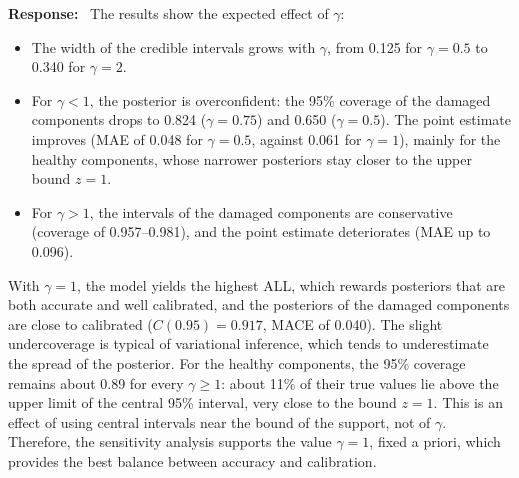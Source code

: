 \documentclass[11pt]{article}
\newenvironment{response}{\par\smallskip\noindent\color{resp}\textbf{Response:}\ }{\par}
\newcommand{\authornote}[1]{\textcolor{note}{\textsf{[Authors: #1]}}}
\begin{document}
\begin{response}
The results show the expected effect of $\gamma$:
\begin{itemize}[leftmargin=*]
	\item The width of the credible intervals grows with $\gamma$, from 0.125 for $\gamma=0.5$ to 0.340 for $\gamma=2$.
	\item For $\gamma<1$, the posterior is overconfident: the 95\% coverage of the damaged components drops to 0.824 ($\gamma=0.75$) and 0.650 ($\gamma=0.5$). The point estimate improves (MAE of 0.048 for $\gamma=0.5$, against 0.061 for $\gamma=1$), mainly for the healthy components, whose narrower posteriors stay closer to the upper bound $z=1$.
	\item For $\gamma>1$, the intervals of the damaged components are conservative (coverage of 0.957--0.981), and the point estimate deteriorates (MAE up to 0.096).
\end{itemize}
With $\gamma=1$, the model yields the highest ALL, which rewards posteriors that are both accurate and well calibrated, and the posteriors of the damaged components are close to calibrated ($C(0.95)=0.917$, MACE of 0.040).
The slight undercoverage is typical of variational inference, which tends to underestimate the spread of the posterior.
For the healthy components, the 95\% coverage remains about 0.89 for every $\gamma\geq1$: about 11\% of their true values lie above the upper limit of the central 95\% interval, very close to the bound $z=1$.
This is an effect of using central intervals near the bound of the support, not of $\gamma$.
Therefore, the sensitivity analysis supports the value $\gamma=1$, fixed a priori, which provides the best balance between accuracy and calibration.
\end{response}
\end{document}
